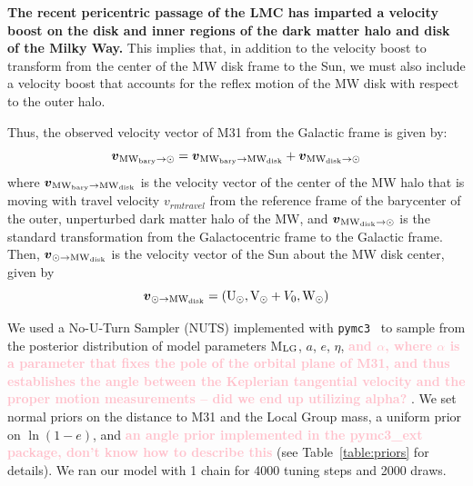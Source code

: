 \documentclass[twocolumn]{aastex631}
\newcommand{\mlg}{M$_{\rm LG}$}
\newcommand{\kc}[1]{\textcolor{pink}{\textbf{#1}} }
\newcommand{\bov}{\boldsymbol{v}}
\newcommand{\vel}[2]{\bov_{\rm #1 \to #2}}
\newcommand{\mwbary}{\rm MW_{bary}}
\newcommand{\mwdisk}{\rm MW_{disk}}
\begin{document}
\textbf{The recent pericentric passage of the LMC has imparted a velocity boost on the disk and inner regions of the dark matter halo and disk of the Milky Way.} This implies that, in addition to the velocity boost to transform from the center of the MW disk frame to the Sun, we must also include a velocity boost that accounts for the 
reflex motion of the MW disk with respect to the outer halo.

Thus, the observed velocity vector of M31 from the Galactic frame is given by:
\begin{equation}
  \vel{\mwbary}{\odot} = \vel{\mwbary}{\mwdisk} + \vel{\mwdisk}{\odot}
\end{equation}
where $\vel{\mwbary}{\mwdisk}$ is the velocity vector of the center of the MW halo that is moving with travel velocity $v_{rm travel}$ from the reference frame of the barycenter of the outer, unperturbed dark matter halo of the MW, and $\vel{\mwdisk}{\odot}$ is the standard transformation from the Galactocentric frame to the Galactic frame.
Then, $\vel{\odot}{\mwdisk}$ is the velocity vector of the Sun about the MW disk center, given by 
\begin{equation}
  \vel{\odot}{\mwdisk}=({\rm U}_\odot, {\rm V}_\odot + V_0, {\rm W}_\odot)  
\end{equation}



We used a No-U-Turn Sampler (NUTS) implemented with \texttt{pymc3}~\citep{Salvatier2016} to sample from the posterior distribution of model parameters \mlg, $a$, $e$, $\eta$, \kc{and $\alpha$, where $\alpha$ is a parameter that fixes the pole of the orbital plane of M31, and thus establishes the angle between the Keplerian tangential velocity and the proper motion measurements -- did we end up utilizing alpha?}. We set normal priors on the distance to M31 and the Local Group mass, a uniform prior on $\ln(1-e)$, and \kc{an angle prior implemented in the pymc3\_ext package, don't know how to describe this} (see Table~\ref{table:priors} for details). We ran our model with 1 chain for 4000 tuning steps and 2000 draws. 

\end{document}
